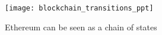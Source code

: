 \begin{figure}[ht!]
    \centering
    \texttt{[image: blockchain\_transitions\_ppt]}
    \caption{Ethereum can be seen as a chain of states~\cite{visual}}
    \label{fig:worldstate_update}
\end{figure}